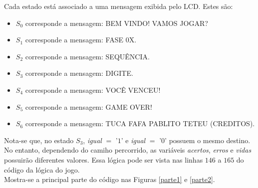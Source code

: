 \documentclass[14pt, oneside]{book}
\newcommand\tab[1][1cm]{\hspace*{#1}}
\theoremstyle{definition}
\begin{document}
\begin{center}
                \end{center}
                \tab Cada estado está associado a uma mensagem exibida pelo LCD. Estes são:        
                \begin{itemize}
                    \item $S_0$ corresponde a mensagem: BEM VINDO! VAMOS JOGAR?
                    \item $S_1$ corresponde a mensagem: FASE 0X.
                    \item $S_2$ corresponde a mensagem: SEQUÊNCIA. 
                    \item $S_3$ corresponde a mensagem: DIGITE. 
                    \item $S_4$ corresponde a mensagem: VOCÊ VENCEU!
                    \item $S_5$ corresponde a mensagem: GAME OVER!
                    \item $S_6$ corresponde a mensagem: TUCA FAFA PABLITO TETEU (CREDITOS).
                \end {itemize}
                \tab Nota-se que, no estado $S_3$, \textit{igual} $=$ '$1$' e \textit{igual} $=$ '$0$' possuem o mesmo destino. No entanto, dependendo do camiho percorrido, as variáveis \textit{acertos}, \textit{erros} e \textit{vidas} possuirão diferentes valores. Essa lógica pode ser vista nas linhas $146$ a $165$ do código da lógica do jogo. \\
                \tab Mostra-se a principal parte do código nas Figuras \ref{parte1} e \ref{parte2}.
                    
\end{document}
